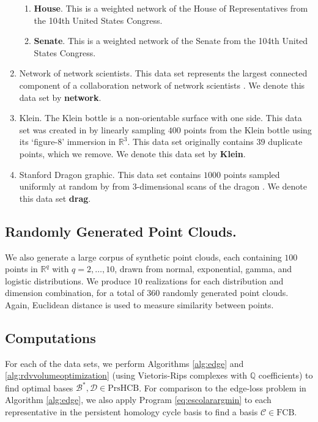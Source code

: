 \documentclass[utf8]{formatting_stuff/frontiersFPHY}
\newcommand{\Q}{\mathbb{Q}}
\newcommand{\fcyclebasis}{\mathcal{C}}
\newcommand{\setoffilteredcyclebases}{\mathrm{FCB}}
\newcommand{\setofpersistenthcyclebases}{\mathrm{PrsHCB}}
\newcommand{\pr}{Program }
\newcommand{\hcyclebasis}{\mathcal B}
\newcommand{\deathbasis}{\mathcal D}
\theoremstyle{plain}
\theoremstyle{definition}
\begin{document}
\begin{enumerate}
    \begin{enumerate}
        \item \textbf{House}. This is a weighted network of the House of Representatives from the 104th United States Congress.  
        \item \textbf{Senate}. This is a weighted network of the Senate from the 104th United States Congress. 
    \end{enumerate}
    \item Network of network scientists. This data set represents the largest connected component of a collaboration network of network scientists \cite{newman2006finding}.   
    We denote this data set by \textbf{network}. 
    \item Klein. The Klein bottle is a non-orientable surface with one side. This data set was created in \cite{roadmap2017} by linearly sampling $400$ points from the Klein bottle using its  `figure-8' immersion in $\mathbb{R}^3$. This data set originally contains $39$ duplicate points, which we remove. 
    We denote this data set by \textbf{Klein}. 
    \item Stanford Dragon graphic. This data set contains $1000$ points sampled uniformly  at random by \cite{roadmap2017} from $3$-dimensional scans of the dragon \cite{drag}. We denote this data set \textbf{drag}.
\end{enumerate}
\vspace{0.2cm}  
\subsection{Randomly Generated Point Clouds.}\label{sec: randompointclouds}
We also generate a large corpus of synthetic point clouds, each containing $100$ points in $\mathbb{R}^q$ with $q = 2,\ldots,10$, drawn from normal, exponential, gamma, and logistic distributions. We produce $10$ realizations for each distribution and dimension combination, for a total of $360$ randomly generated point clouds. Again, Euclidean distance is used to measure similarity between points.

\subsection{Computations}

For each of the data sets, we perform Algorithms \ref{alg:edge} and \ref{alg:rdvvolumeoptimization} (using Vietoris-Rips complexes with $\Q$ coefficients) to find optimal bases $\hcyclebasis^*, \deathbasis \in \setofpersistenthcyclebases$.  For comparison to the edge-loss problem in Algorithm \ref{alg:edge}, we also apply \pr \eqref{eq:escolarargmin} to each representative in the persistent homology cycle basis to find a basis $\fcyclebasis \in \setoffilteredcyclebases$.
\end{document}
